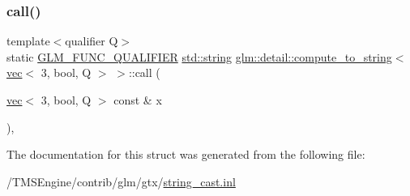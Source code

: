 \subsubsection{\texorpdfstring{call()}{call()}}
{\footnotesize\ttfamily template$<$qualifier Q$>$ \\
static \hyperlink{setup_8hpp_a33fdea6f91c5f834105f7415e2a64407}{G\+L\+M\+\_\+\+F\+U\+N\+C\+\_\+\+Q\+U\+A\+L\+I\+F\+I\+ER} \hyperlink{_s_d_l__opengl__glext_8h_ae84541b4f3d8e1ea24ec0f466a8c568b}{std\+::string} \hyperlink{structglm_1_1detail_1_1compute__to__string}{glm\+::detail\+::compute\+\_\+to\+\_\+string}$<$ \hyperlink{structglm_1_1vec}{vec}$<$ 3, bool, Q $>$ $>$\+::call (\begin{DoxyParamCaption}\item[{\hyperlink{structglm_1_1vec}{vec}$<$ 3, bool, Q $>$ const \&}]{x }\end{DoxyParamCaption})\hspace{0.3cm}{\ttfamily [inline]}, {\ttfamily [static]}}



The documentation for this struct was generated from the following file\+:\begin{DoxyCompactItemize}
\item 
/\+T\+M\+S\+Engine/contrib/glm/gtx/\hyperlink{string__cast_8inl}{string\+\_\+cast.\+inl}\end{DoxyCompactItemize}
